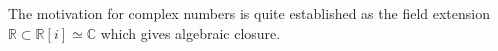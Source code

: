 The motivation for complex numbers is quite established as the field extension $\mathbb{R} \subset \mathbb{R}[i] \simeq \mathbb{C}$ which gives algebraic closure. 

